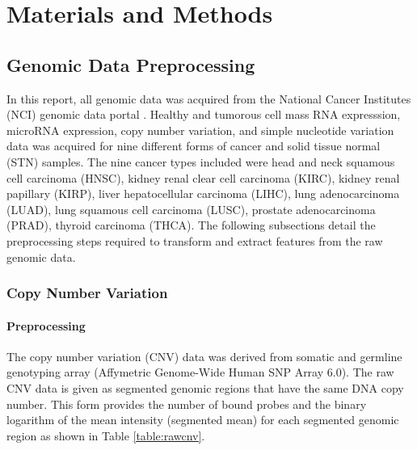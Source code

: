 \chapter{Materials and Methods} \label{chap:experiments}

\section{Genomic Data Preprocessing}

In this report, all genomic data was acquired from the National Cancer Institutes (NCI) genomic data portal \cite{grossman2016toward}. Healthy and tumorous cell mass RNA expresssion, microRNA expression, copy number variation, and simple nucleotide variation data was acquired for nine different forms of cancer and solid tissue normal (STN) samples. The nine cancer types included were head and neck squamous cell carcinoma (HNSC), kidney renal clear cell carcinoma (KIRC), kidney renal papillary (KIRP), liver hepatocellular carcinoma (LIHC), lung adenocarcinoma (LUAD), lung squamous cell carcinoma (LUSC), prostate adenocarcinoma (PRAD), thyroid carcinoma (THCA). The following subsections detail the preprocessing steps required to transform and extract features from the raw genomic data.

\subsection{Copy Number Variation}

\subsubsection{Preprocessing}

The copy number variation (CNV) data was derived from somatic and germline genotyping array (Affymetric Genome-Wide Human SNP Array 6.0). The raw CNV data is given as segmented genomic regions that have the same DNA copy number. This form provides the number of bound probes and the binary logarithm of the mean intensity (segmented mean) for each segmented genomic region as shown in Table \ref{table:rawcnv}.

